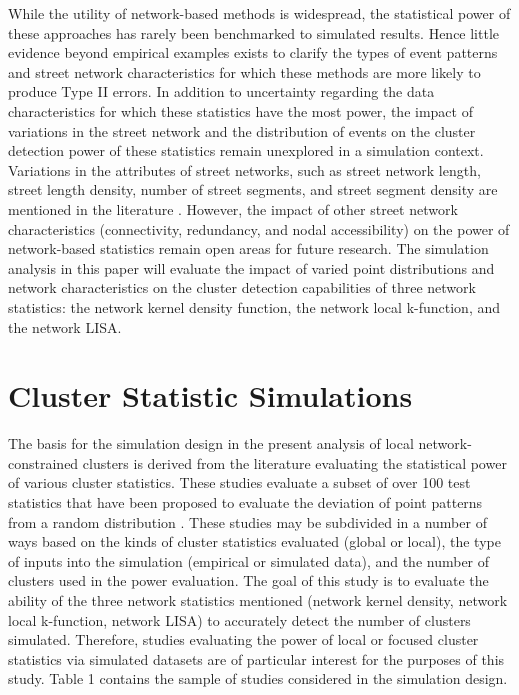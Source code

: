 \documentclass[12pt, letterpaper]{article}
\begin{document}
While the utility of network-based methods is widespread, the statistical power of these approaches has rarely been benchmarked to simulated results. Hence little evidence beyond empirical examples exists to clarify the types of event patterns and street network characteristics for which these methods are more likely to produce Type II errors. In addition to uncertainty regarding the data characteristics for which these statistics have the most power, the impact of variations in the street network and the distribution of events on the cluster detection power of these statistics remain unexplored in a simulation context. Variations in the attributes of street networks, such as street network length, street length density, number of street segments, and street segment density are mentioned in the literature \citep{yamada2004comparison, luchen2007false}. However, the impact of other street network characteristics (connectivity, redundancy, and nodal accessibility) on the power of network-based statistics remain open areas for future research. The simulation analysis in this paper will evaluate the impact of varied point distributions and network characteristics on the cluster detection capabilities of three network statistics: the network kernel density function, the network local k-function, and the network LISA. 
	
\section{Cluster Statistic Simulations}

The basis for the simulation design in the present analysis of local network-constrained clusters is derived from the literature evaluating the statistical power of various cluster statistics. These studies evaluate a subset of over 100 test statistics that have been proposed to evaluate the deviation of point patterns from a random distribution \citep{kulldorff2006tests}. These studies may be subdivided in a number of ways based on the kinds of cluster statistics evaluated (global or local), the type of inputs into the simulation (empirical or simulated data), and the number of clusters used in the power evaluation. The goal of this study is to evaluate the ability of the three network statistics mentioned (network kernel density, network local k-function, network LISA) to accurately detect the number of clusters simulated. Therefore, studies evaluating the power of local or focused cluster statistics via simulated datasets are of particular interest for the purposes of this study. Table 1 contains the sample of studies considered in the simulation design.
\end{document}
